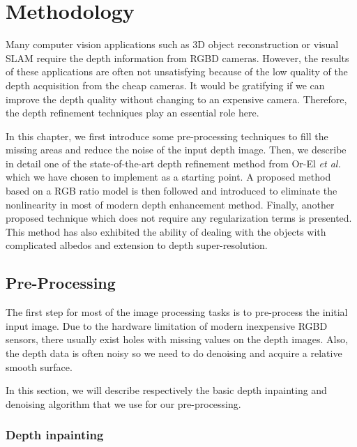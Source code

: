 \chapter{Methodology} \label{chap:methodology}
Many computer vision applications such as 3D object reconstruction or visual SLAM require the depth information from RGBD cameras. 
However, the results of these applications are often not unsatisfying because of the low quality of the depth acquisition from the cheap cameras. 
It would be gratifying if we can improve the depth quality without changing to an expensive camera.
Therefore, the depth refinement techniques play an essential role here.

In this chapter, we first introduce some pre-processing techniques to fill the missing areas and reduce the noise of the input depth image. 
Then, we describe in detail one of the state-of-the-art depth refinement method from Or-El \emph{et al.}~\cite{or2015rgbd} which we have chosen to implement as a starting point.
A proposed method based on a RGB ratio model is then followed and introduced to eliminate the nonlinearity in most of modern depth enhancement method.
Finally, another proposed technique which does not require any regularization terms is presented. 
This method has also exhibited the ability of dealing with the objects with complicated albedos and extension to depth super-resolution.
 

\section{Pre-Processing}
The first step for most of the image processing tasks is to pre-process the initial input image. 
Due to the hardware limitation of modern inexpensive RGBD sensors, there usually exist holes with missing values on the depth images. 
Also, the depth data is often noisy so we need to do denoising and acquire a relative smooth surface.

In this section, we will describe respectively the basic depth inpainting and denoising algorithm that we use for our pre-processing. 
\subsection{Depth inpainting}


